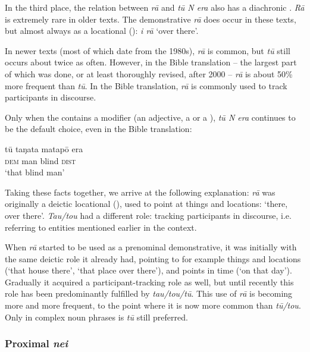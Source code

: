 In the third place, the relation between \textit{rā} and \textit{tū N era} also has a diachronic . \textit{Rā} is extremely rare in older texts. The demonstrative \textit{rā} does occur in these texts, but almost always as a locational (): \textit{{\ꞌ}i rā} ‘over there’. 

In newer texts (most of which date from the 1980s), \textit{rā} is common, but \textit{tū} still occurs about twice as often. However, in the Bible translation – the largest part of which was done, or at least thoroughly revised, after 2000 – \textit{rā} is about 50\% more frequent than \textit{tū}. In the Bible translation, \textit{rā} is commonly used to track participants in discourse. 

Only when the  contains a modifier (an adjective, a  or a ), \textit{tū N era} continues to be the default choice, even in the Bible translation:

\ea\label{ex:4.218}
\gll tū taŋata matapō era \\
\textsc{dem} man blind \textsc{dist} \\

\glt
‘that blind man’ \textstyleExampleref{[John 9:6]}
\z

Taking these facts together, we arrive at the following explanation: \textit{rā} was originally a deictic locational (), used to point at things and locations: ‘there, over there’. \textit{Tau/tou} had a different role: tracking participants in discourse, i.e. referring to entities mentioned earlier in the context. 

When \textit{rā} started to be used as a prenominal demonstrative, it was initially with the same deictic role it already had, pointing to for example things and locations (‘that house there’, ‘that place over there’), and points in time (‘on that day’). Gradually it acquired a participant-tracking role as well, but until recently this role has been predominantly fulfilled by \textit{tau/tou/tū}. This use of \textit{rā} is becoming more and more frequent, to the point where it is now more common than \textit{tū}\textit{/tou}. Only in complex noun phrases is \textit{tū} still preferred.
\subsubsection[Proximal nei]{Proximal \textit{nei}}\label{sec:4.6.4.2}

